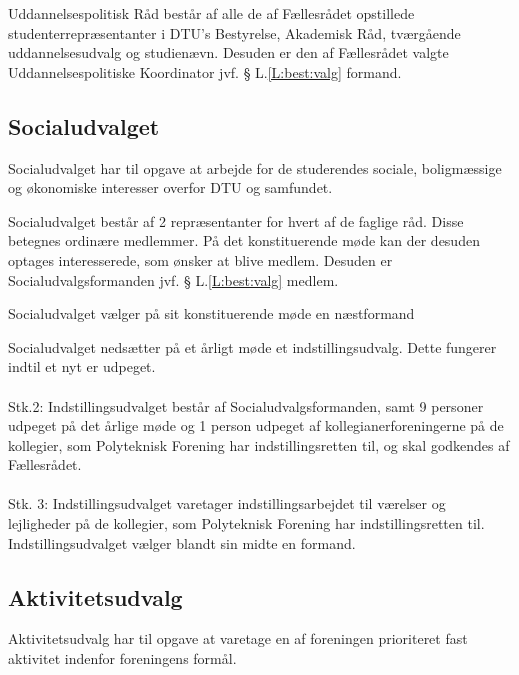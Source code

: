 \begin{list}
\item
Uddannelsespolitisk Råd består af alle de af Fællesrådet opstillede studenterrepræsentanter i DTU’s
Bestyrelse, Akademisk Råd, tværgående uddannelsesudvalg og studienævn. Desuden er den af Fællesrådet
valgte Uddannelsespolitiske Koordinator jvf. § L.\ref{L:best:valg} formand.


\subsection{Socialudvalget}
\item Socialudvalget har til opgave at arbejde for de studerendes sociale, boligmæssige og økonomiske interesser overfor DTU og samfundet.

\item Socialudvalget består af 2 repræsentanter for hvert af de faglige råd. Disse betegnes ordinære medlemmer. På det konstituerende møde kan der desuden optages interesserede, som ønsker at blive medlem. Desuden er Socialudvalgsformanden jvf. § L.\ref{L:best:valg} medlem.

\item Socialudvalget vælger på sit konstituerende møde en næstformand

\item Socialudvalget nedsætter på et årligt møde et indstillingsudvalg. Dette fungerer indtil et nyt er udpeget.
\\
\\
Stk.2: Indstillingsudvalget består af Socialudvalgsformanden, samt 9 personer udpeget på det årlige møde og 1 person udpeget af kollegianerforeningerne på de kollegier, som Polyteknisk Forening har indstillingsretten til, og skal godkendes af Fællesrådet.
\\
\\
Stk. 3: Indstillingsudvalget varetager indstillingsarbejdet til værelser og lejligheder på de kollegier, som Polyteknisk Forening har indstillingsretten til. Indstillingsudvalget vælger blandt sin midte en formand.




\subsection{Aktivitetsudvalg}
\item Aktivitetsudvalg har til opgave at varetage en af foreningen prioriteret fast aktivitet indenfor foreningens formål.


\end{list}
